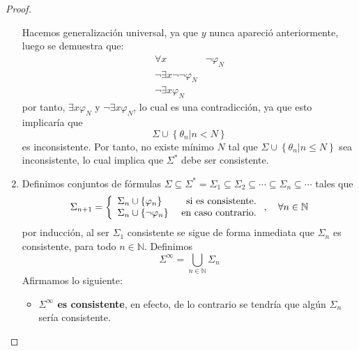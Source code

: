 \documentclass[12pt]{report}
\newcounter{it}
\theoremstyle{largebreak}
\begin{document}
\begin{proof}
\begin{enumerate}[label = \textit{(\alph*)}]
            Hacemos generalización universal, ya que $y$ nunca apareció anteriormente, luego se demuestra que:
            \begin{equation*}
                \begin{split}
                    \forall x&\neg\varphi_N\\
                    \neg\exists x\neg\neg\varphi_N\\
                    \neg\exists x\varphi_N
                \end{split}
            \end{equation*}
            por tanto, $\exists x\varphi_N$ y $\neg\exists x\varphi_N$, lo cual es una contradicción, ya que esto implicaría que
            \begin{equation*}
                \Sigma\cup\left\{\theta_n\Big|n<N \right\}
            \end{equation*}
            es inconsistente. Por tanto, no existe mínimo $N$ tal que $\Sigma\cup\left\{\theta_n\Big|n\leq N \right\}$ sea inconsistente, lo cual implica que $\Sigma^*$ debe ser consistente.
            \item Definimos conjuntos de fórmulas $\Sigma\subseteq\Sigma^*=\Sigma_1\subseteq\Sigma_2\subseteq\cdots\subseteq\Sigma_n\subseteq\cdots$ tales que
            \begin{equation*}
                \Sigma_{ n+1}=\left\{
                    \begin{array}{lr}
                        \Sigma_n\cup\left\{\varphi_n \right\} & \textup{ si es consistente}.\\
                        \Sigma_n\cup\left\{\neg\varphi_n \right\} & \textup{ en caso contrario}.\\
                    \end{array}
                \right.,\quad\forall n\in\mathbb{N}
            \end{equation*}
            por inducción, al ser $\Sigma_1$ consistente se sigue de forma inmediata que $\Sigma_n$ es consistente, para todo $n\in\mathbb{N}$. Definimos
            \begin{equation*}
                \Sigma^{\infty}=\bigcup_{n\in\mathbb{N}}\Sigma_n
            \end{equation*}
            Afirmamos lo siguiente:
            \begin{itemize}
                \item \textbf{$\Sigma^{\infty}$ es consistente}, en efecto, de lo contrario se tendría que algún $\Sigma_n$ sería consistente.

\end{itemize}
\end{enumerate}
\end{proof}
\end{document}

